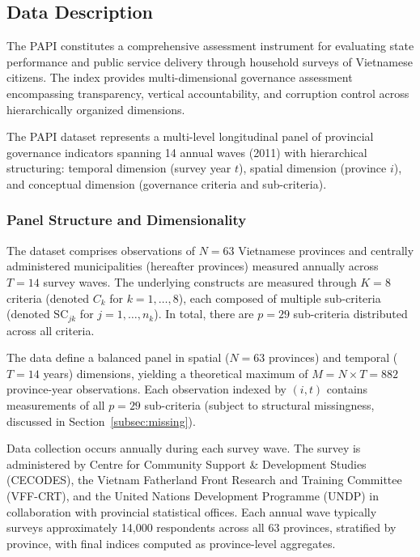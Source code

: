 \documentclass[12pt,a4paper]{article}
\begin{document}
\subsection{Data Description}
\label{subsec:data}

The PAPI constitutes a comprehensive assessment instrument for evaluating state performance and public service delivery through household surveys of Vietnamese citizens. The index provides multi-dimensional governance assessment encompassing transparency, vertical accountability, and corruption control across hierarchically organized dimensions.


The PAPI dataset represents a multi-level longitudinal panel of provincial governance indicators spanning 14 annual waves (2011) with hierarchical structuring: temporal dimension (survey year $t$), spatial dimension (province $i$), and conceptual dimension (governance criteria and sub-criteria).

\subsubsection{Panel Structure and Dimensionality}

The dataset comprises observations of $N = 63$ Vietnamese provinces and centrally administered municipalities (hereafter provinces) measured annually across $T = 14$ survey waves. The underlying constructs are measured through $K = 8$ criteria (denoted $C_k$ for $k = 1, \ldots, 8$), each composed of multiple sub-criteria (denoted $\text{SC}_{jk}$ for $j = 1, \ldots, n_k$). In total, there are $p = 29$ sub-criteria distributed across all criteria.

The data define a balanced panel in spatial ($N = 63$ provinces) and temporal ($T = 14$ years) dimensions, yielding a theoretical maximum of $M = N \times T = 882$ province-year observations. Each observation indexed by $(i, t)$ contains measurements of all $p = 29$ sub-criteria (subject to structural missingness, discussed in Section~\ref{subsec:missing}).

Data collection occurs annually during each survey wave. The survey is administered by Centre for Community Support \& Development Studies (CECODES), the Vietnam Fatherland Front Research and Training Committee (VFF-CRT), and the United Nations Development Programme (UNDP) in collaboration with provincial statistical offices. Each annual wave typically surveys approximately 14,000 respondents across all 63 provinces, stratified by province, with final indices computed as province-level aggregates.
\end{document}
